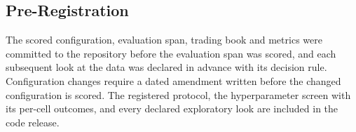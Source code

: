 \subsection{Pre-Registration}

The scored configuration, evaluation span, trading book and metrics were
committed to the repository before the evaluation span was scored, and
each subsequent look at the data was declared in advance with its
decision rule. Configuration changes require a dated amendment written
before the changed configuration is scored. The registered protocol,
the hyperparameter screen with its per-cell outcomes, and every declared
exploratory look are included in the code release.
